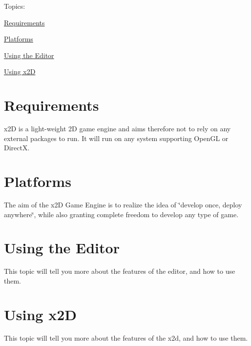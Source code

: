 Topics\+:
\begin{DoxyItemize}
\item \hyperlink{require}{Requirements}
\item \hyperlink{platforms}{Platforms}
\item \hyperlink{using_editor}{Using the Editor}
\item \hyperlink{using_x2d}{Using x2\+D} 
\end{DoxyItemize}\hypertarget{require}{}\section{Requirements}\label{require}
x2\+D is a light-\/weight 2\+D game engine and aims therefore not to rely on any external packages to run. It will run on any system supporting Open\+G\+L or Direct\+X. \hypertarget{platforms}{}\section{Platforms}\label{platforms}
The aim of the x2\+D Game Engine is to realize the idea of \char`\"{}develop once, deploy anywhere\char`\"{}, while also granting complete freedom to develop any type of game. \hypertarget{using_editor}{}\section{Using the Editor}\label{using_editor}
This topic will tell you more about the features of the editor, and how to use them. \hypertarget{using_x2d}{}\section{Using x2\+D}\label{using_x2d}
This topic will tell you more about the features of the x2d, and how to use them. 